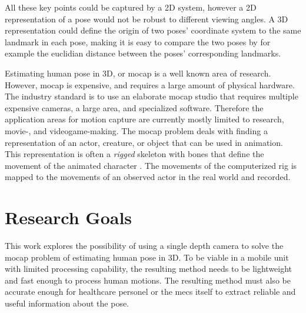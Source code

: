 All these key points could be captured by a 2D system, however a 2D representation of a pose would not be robust to different viewing angles. A 3D representation could define the origin of two poses' coordinate system to the same landmark in each pose, making it is easy to compare the two poses by for example the euclidian distance between the poses' corresponding landmarks.

Estimating human pose in 3D, or \gls{mocap} is a well known area of research. However, \gls{mocap} is expensive, and requires a large amount of physical hardware. The industry standard is to use an elaborate \gls{mocap} studio that requires multiple expensive cameras, a large area, and specialized software. Therefore the application areas for motion capture are currently mostly limited to research, movie-, and videogame-making. The \gls{mocap} problem deals with finding a representation of an actor, creature, or object that can be used in animation. This representation is often a \emph{rigged} skeleton with bones that define the movement of the animated character \cite{skeletonAnimation}. The movements of the computerized rig is mapped to the movements of an observed actor in the real world and recorded.




\section{Research Goals}

This work explores the possibility of using a single depth camera to solve the \gls{mocap} problem of estimating human pose in 3D. To be viable in a mobile unit with limited processing capability, the resulting method needs to be lightweight and fast enough to process human motions. The resulting method must also be accurate enough for healthcare personel or the \gls{mecs} itself to extract reliable and useful information about the pose.

